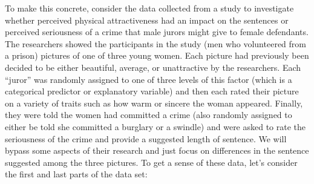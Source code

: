 \documentclass[]{book}
\theoremstyle{definition}
\theoremstyle{definition}
\theoremstyle{remark}
\begin{document}
To make this concrete, consider the data collected from a study
\citep{Plaster1989} to investigate whether perceived physical
attractiveness had an impact on the sentences or perceived seriousness
of a crime that male jurors might give to female defendants. The
researchers showed the participants in the study (men who volunteered
from a prison) pictures of one of three young women. Each picture had
previously been decided to be either beautiful, average, or unattractive
by the researchers. Each ``juror'' was randomly assigned to one of three
levels of this factor (which is a categorical predictor or explanatory
variable) and then each rated their picture on a variety of traits such
as how warm or sincere the woman appeared. Finally, they were told the
women had committed a crime (also randomly assigned to either be told
she committed a burglary or a swindle) and were asked to rate the
seriousness of the crime and provide a suggested length of sentence. We
will bypass some aspects of their research and just focus on differences
in the sentence suggested among the three pictures. To get a sense of
these data, let's consider the first and last parts of the data set:
\end{document}
